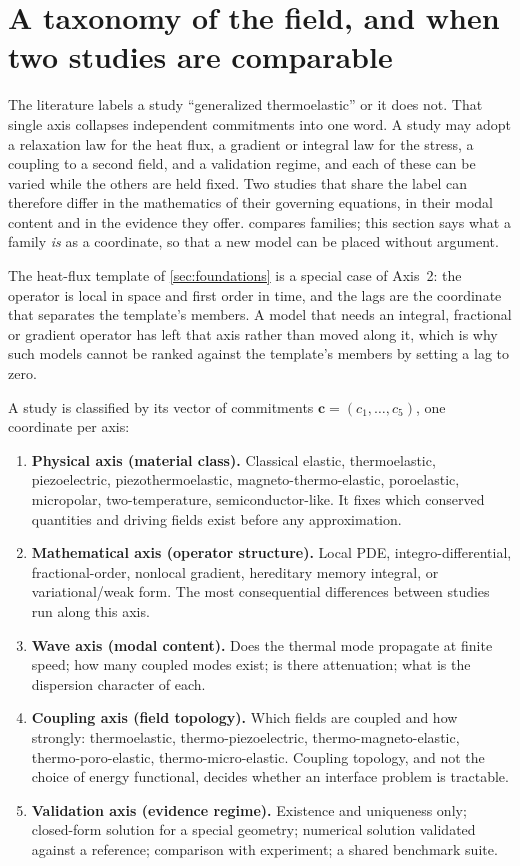 \section{A taxonomy of the field, and when two studies are comparable}\label{sec:taxonomy}

The literature labels a study ``generalized thermoelastic'' or it does not. That single axis collapses
independent commitments into one word. A study may adopt a relaxation law for the heat flux, a gradient or
integral law for the stress, a coupling to a second field, and a validation regime, and each of these can
be varied while the others are held fixed. Two studies that share the label can therefore differ in the
mathematics of their governing equations, in their modal content and in the evidence they offer.
 compares families; this section says what a family \emph{is} as a coordinate, so that a
new model can be placed without argument.

The heat-flux template of \cref{sec:foundations} is a special case of Axis~2: the operator is local in
space and first order in time, and the lags are the coordinate that separates the template's members. A
model that needs an integral, fractional or gradient operator has left that axis rather than moved along
it, which is why such models cannot be ranked against the template's members by setting a lag to zero.

A study is classified by its vector of commitments $\mathbf{c}=(c_1,\dots,c_5)$, one coordinate per axis:

\begin{enumerate}[label=\textbf{Axis \arabic*:}]
\item \textbf{Physical axis (material class).} Classical elastic, thermoelastic, piezoelectric,
  piezothermoelastic, magneto-thermo-elastic, poroelastic, micropolar, two-temperature, semiconductor-like.
  It fixes which conserved quantities and driving fields exist before any approximation.
\item \textbf{Mathematical axis (operator structure).} Local PDE, integro-differential, fractional-order,
  nonlocal gradient, hereditary memory integral, or variational/weak form. The most consequential
  differences between studies run along this axis.
\item \textbf{Wave axis (modal content).} Does the thermal mode propagate at finite speed; how many coupled
  modes exist; is there attenuation; what is the dispersion character of each.
\item \textbf{Coupling axis (field topology).} Which fields are coupled and how strongly:
  thermoelastic, thermo-piezoelectric, thermo-magneto-elastic, thermo-poro-elastic, thermo-micro-elastic.
  Coupling topology, and not the choice of energy functional, decides whether an interface problem is
  tractable.
\item \textbf{Validation axis (evidence regime).} Existence and uniqueness only; closed-form solution for a
  special geometry; numerical solution validated against a reference; comparison with experiment; a shared
  benchmark suite.
\end{enumerate}

